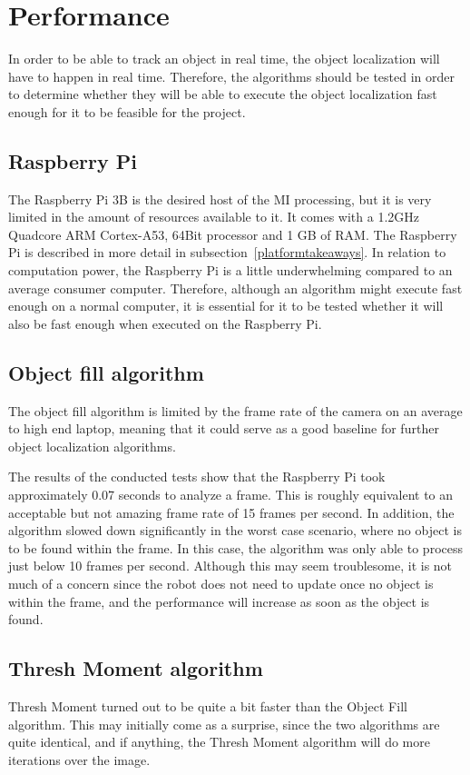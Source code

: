\section{Performance}
In order to be able to track an object in real time, the object localization will have to happen in real time.
Therefore, the algorithms should be tested in order to determine whether they will be able to execute the object localization fast enough for it to be feasible for the project.

\subsection{Raspberry Pi}
The Raspberry Pi 3B is the desired host of the MI processing, but it is very limited in the amount of resources available to it.
It comes with a 1.2GHz Quadcore ARM Cortex-A53, 64Bit processor and 1 GB of RAM.
The Raspberry Pi is described in more detail in subsection~\ref{platformtakeaways}.
In relation to computation power, the Raspberry Pi is a little underwhelming compared to an average consumer computer.
Therefore, although an algorithm might execute fast enough on a normal computer, it is essential for it to be tested whether it will also be fast enough when executed on the Raspberry Pi.

\subsection{Object fill algorithm}
The object fill algorithm is limited by the frame rate of the camera on an average to high end laptop, meaning that it could serve as a good baseline for further object localization algorithms.

The results of the conducted tests show that the Raspberry Pi took approximately 0.07 seconds to analyze a frame.
This is roughly equivalent to an acceptable but not amazing frame rate of 15 frames per second.
In addition, the algorithm slowed down significantly in the worst case scenario, where no object is to be found within the frame.
In this case, the algorithm was only able to process just below 10 frames per second.
Although this may seem troublesome, it is not much of a concern since the robot does not need to update once no object is within the frame, and the performance will increase as soon as the object is found.

\subsection{Thresh Moment algorithm}
Thresh Moment turned out to be quite a bit faster than the Object Fill algorithm.
This may initially come as a surprise, since the two algorithms are quite identical, and if anything, the Thresh Moment algorithm will do more iterations over the image.

